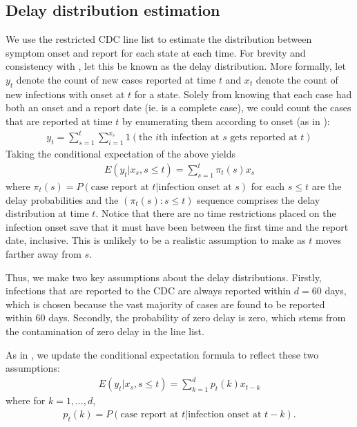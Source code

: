 \documentclass{article}
\begin{document}
\subsection{Delay distribution estimation} We use the restricted CDC line list to estimate the distribution between symptom onset and report for each state at each time. For brevity and consistency with \citet{jahja2022real}, let this be known as the delay distribution. More formally, let $y_t$ denote the count of new cases reported at time $t$ and $x_t$ denote the count of new infections with onset at $t$ for a state. Solely from knowing that each case had both an onset and a report date (ie. is a complete case), we could count the cases that are reported at time $t$ by enumerating them according to onset (as in \citet{jahja2022real}):
\begin{align*}
y_t = \sum_{s=1}^{t} \sum_{i=1}^{x_s}1 \left ( \text{the }i\text{th infection at } s \text{ gets reported at }t \right )
\end{align*}
Taking the conditional expectation of the above yields
\begin{align*}
E(y_t | x_s, s \leq t) = \sum_{s=1}^{t} \pi_t(s) x_s 
\end{align*}
where $\pi_t(s) = P(\text{case report at }t| \text{infection onset at }s)$ for each $s \leq t$ are the delay probabilities and the $\left ( \pi_t(s) : s \leq t \right)$ sequence comprises the delay distribution at time $t$. Notice that there are no time restrictions placed on the infection onset save that it must have been between the first time and the report date, inclusive. This is unlikely to be a realistic assumption to make as $t$ moves farther away from $s$. 

Thus, we make two key assumptions about the delay distributions. Firstly, infections that are reported to the CDC are always reported within $d = 60$ days, which is chosen because the vast majority of cases are found to be reported within $60$ days. Secondly, the probability of zero delay is zero, which stems from the contamination of zero delay in the line list. 

As in \citet{jahja2022real}, we update the conditional expectation formula to reflect these two assumptions: %
\begin{align*}
E(y_t | x_s, s \leq t) = \sum_{k=1}^{d} p_t(k) x_{t-k}
\end{align*}
where for $k = 1, \dots, d$,
\begin{align*}
p_t(k) = P(\text{case report at }t | \text{infection onset at }t-k).
\end{align*}
\end{document}

